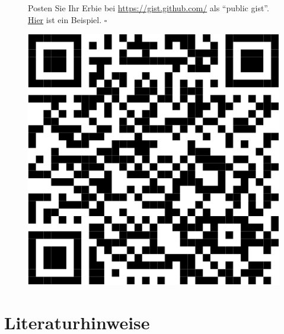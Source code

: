 \documentclass[
  letterpaper,
  twoside,
  open=any]{scrbook}
\theoremstyle{definition}
\theoremstyle{definition}
\theoremstyle{definition}
\theoremstyle{remark}
\begin{document}
\begin{tcolorbox}[enhanced jigsaw, colframe=quarto-callout-tip-color-frame, arc=.35mm, leftrule=.75mm, bottomtitle=1mm, titlerule=0mm, colbacktitle=quarto-callout-tip-color!10!white, breakable, bottomrule=.15mm, colback=white, left=2mm, rightrule=.15mm, opacityback=0, toptitle=1mm, toprule=.15mm, opacitybacktitle=0.6, title=\textcolor{quarto-callout-tip-color}{\faLightbulb}\hspace{0.5em}{Tipp}, coltitle=black]

\begin{figure}[H]

\begin{minipage}{0.80\linewidth}
Posten Sie Ihr Erbie bei \url{https://gist.github.com/} als
\enquote{public gist}.
\href{https://gist.github.com/sebastiansauer/0649a0453b5cc7c6a1d16ac760667215}{Hier}
ist ein Beispiel. \(\square\)\end{minipage}%
%
\begin{minipage}{0.20\linewidth}

\begin{center}
\includegraphics[width=0.75\linewidth,height=\textheight,keepaspectratio]{030-aufbereiten_files/figure-pdf/unnamed-chunk-49-1.pdf}
\end{center}

\end{minipage}%

\end{figure}%

\end{tcolorbox}

\section{Literaturhinweise}\label{literaturhinweise-2}
\end{document}
